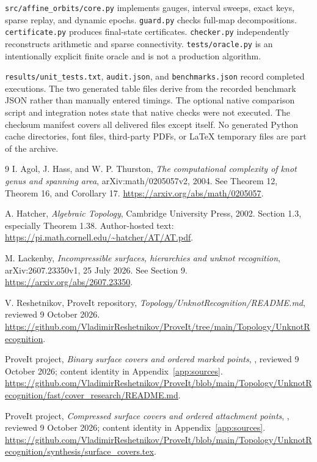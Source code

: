 \documentclass[11pt]{article}
\theoremstyle{definition}
\newcommand{\code}[1]{\texttt{#1}}
\begin{document}
\code{src/affine\_orbits/core.py} implements gauges, interval sweeps, exact keys, sparse replay, and dynamic epochs. \code{guard.py} checks full-map decompositions. \code{certificate.py} produces final-state certificates. \code{checker.py} independently reconstructs arithmetic and sparse connectivity. \code{tests/oracle.py} is an intentionally explicit finite oracle and is not a production algorithm.

\code{results/unit\_tests.txt}, \code{audit.json}, and \code{benchmarks.json} record completed executions. The two generated table files derive from the recorded benchmark JSON rather than manually entered timings. The optional native comparison script and integration notes state that native checks were not executed. The checksum manifest covers all delivered files except itself. No generated Python cache directories, font files, third-party PDFs, or LaTeX temporary files are part of the archive.

\begin{thebibliography}{9}
I. Agol, J. Hass, and W. P. Thurston,
\emph{The computational complexity of knot genus and spanning area},
arXiv:math/0205057v2, 2004. See Theorem 12, Theorem 16, and Corollary 17.
\url{https://arxiv.org/abs/math/0205057}.

A. Hatcher, \emph{Algebraic Topology}, Cambridge University Press, 2002.
Section 1.3, especially Theorem 1.38.
Author-hosted text: \url{https://pi.math.cornell.edu/~hatcher/AT/AT.pdf}.

M. Lackenby, \emph{Incompressible surfaces, hierarchies and unknot recognition},
arXiv:2607.23350v1, 25 July 2026. See Section 9.
\url{https://arxiv.org/abs/2607.23350}.

V. Reshetnikov, ProveIt repository,
\emph{Topology/UnknotRecognition/README.md}, reviewed 9 October 2026.
\url{https://github.com/VladimirReshetnikov/ProveIt/tree/main/Topology/UnknotRecognition}.

ProveIt project, \emph{Binary surface covers and ordered marked points},
,
reviewed 9 October 2026; content identity in Appendix~\ref{app:sources}.
\url{https://github.com/VladimirReshetnikov/ProveIt/blob/main/Topology/UnknotRecognition/fast/cover_research/README.md}.

ProveIt project, \emph{Compressed surface covers and ordered attachment points},
,
reviewed 9 October 2026; content identity in Appendix~\ref{app:sources}.
\url{https://github.com/VladimirReshetnikov/ProveIt/blob/main/Topology/UnknotRecognition/synthesis/surface_covers.tex}.
\end{thebibliography}
\end{document}
